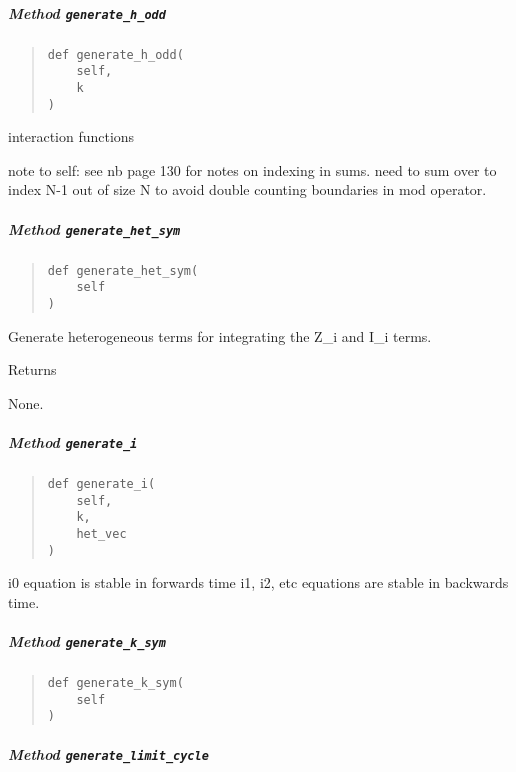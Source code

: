 \documentclass[english,a4paper,oneside]{article}
\let\oldsubparagraph\subparagraph
\renewcommand{\subparagraph}[1]{\oldsubparagraph{#1}\mbox{}}
\begin{document}
\subparagraph{\texorpdfstring{Method
\texttt{generate\_h\_odd}}{Method generate\_h\_odd}}\label{StrongCoupling.StrongCoupling.generate_h_odd}

\begin{quote}
\begin{verbatim}
def generate_h_odd(
    self,
    k
)
\end{verbatim}
\end{quote}

interaction functions

note to self: see nb page 130 for notes on indexing in sums. need to sum
over to index N-1 out of size N to avoid double counting boundaries in
mod operator.

\subparagraph{\texorpdfstring{Method
\texttt{generate\_het\_sym}}{Method generate\_het\_sym}}\label{StrongCoupling.StrongCoupling.generate_het_sym}

\begin{quote}
\begin{verbatim}
def generate_het_sym(
    self
)
\end{verbatim}
\end{quote}

Generate heterogeneous terms for integrating the Z\_i and I\_i terms.

Returns

None.

\subparagraph{\texorpdfstring{Method
\texttt{generate\_i}}{Method generate\_i}}\label{StrongCoupling.StrongCoupling.generate_i}

\begin{quote}
\begin{verbatim}
def generate_i(
    self,
    k,
    het_vec
)
\end{verbatim}
\end{quote}

i0 equation is stable in forwards time i1, i2, etc equations are stable
in backwards time.

\subparagraph{\texorpdfstring{Method
\texttt{generate\_k\_sym}}{Method generate\_k\_sym}}\label{StrongCoupling.StrongCoupling.generate_k_sym}

\begin{quote}
\begin{verbatim}
def generate_k_sym(
    self
)
\end{verbatim}
\end{quote}

\subparagraph{\texorpdfstring{Method
\texttt{generate\_limit\_cycle}}{Method generate\_limit\_cycle}}\label{StrongCoupling.StrongCoupling.generate_limit_cycle}
\end{document}
